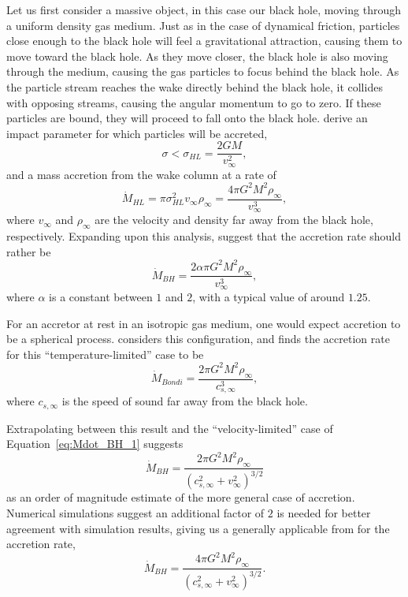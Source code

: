Let us first consider a massive object, in this case our black hole, moving through a uniform density gas medium.  Just as in the case of dynamical friction, particles close enough to the black hole will feel a gravitational attraction, causing them to move toward the black hole.  As they move closer, the black hole is also moving through the medium, causing the gas particles to focus behind the black hole.  As the particle stream reaches the wake directly behind the black hole, it collides with opposing streams, causing the angular momentum to go to zero.  If these particles are bound, they will proceed to fall onto the black hole.  \citet{hoyle_1939} derive an impact parameter for which particles will be accreted,
\begin{equation} \label{eq:sigma}
  \sigma < \sigma_{HL} = \frac{2GM}{v_{\infty}^{2}},
\end{equation}
and a mass accretion from the wake column at a rate of
\begin{equation} \label{eq:Mdot_HL}
  \dot{M}_{HL} = \pi \sigma_{HL}^{2} v_{\infty} \rho_{\infty} = \frac{4 \pi G^{2} M^{2} \rho_{\infty}}{v_{\infty}^{3}},
\end{equation}
where $v_{\infty}$ and $\rho_{\infty}$ are the velocity and density far away from the black hole, respectively.  Expanding upon this analysis, \citet{bondi_1944} suggest that the accretion rate should rather be
\begin{equation} \label{eq:Mdot_BH_1}
  \dot{M}_{BH} = \frac{2 \alpha \pi G^{2} M^{2} \rho_{\infty}}{v_{\infty}^{3}},
\end{equation}
where $\alpha$ is a constant between $1$ and $2$, with a typical value of around $1.25$.

For an accretor at rest in an isotropic gas medium, one would expect accretion to be a spherical process.  \citet{bondi_1952} considers this configuration, and finds the accretion rate for this ``temperature-limited'' case to be
\begin{equation} \label{eq:Mdot_Bondi}
  \dot{M}_{Bondi} = \frac{2 \pi G^{2} M^{2} \rho_{\infty}}{c_{s,\infty}^{3}},
\end{equation}
where $c_{s,\infty}$ is the speed of sound far away from the black hole.

Extrapolating between this result and the ``velocity-limited'' case of Equation~\ref{eq:Mdot_BH_1} suggests \citep{bondi_1952}
\begin{equation} \label{eq:Mdot_BH_2}
  \dot{M}_{BH} = \frac{2 \pi G^{2} M^{2} \rho_{\infty}}{\left(c_{s,\infty}^{2} + v_{\infty}^{2}\right)^{3/2}}
\end{equation}
as an order of magnitude estimate of the more general case of accretion.  Numerical simulations \citep{shima_1985} suggest an additional factor of $2$ is needed for better agreement with simulation results, giving us a generally applicable from for the accretion rate,
\begin{equation} \label{eq:Mdot_BH_3}
  \dot{M}_{BH} = \frac{4 \pi G^{2} M^{2} \rho_{\infty}}{\left(c_{s,\infty}^{2} + v_{\infty}^{2}\right)^{3/2}}.
\end{equation}



